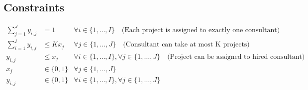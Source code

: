 \documentclass{article}
\begin{document}
\subsection*{Constraints}
\begin{align}
    \sum_{j=1}^{J} y_{i,j} & = 1 & \forall i \in \{1, \ldots, I\} \quad \text{(Each project is assigned to exactly one consultant)} \\
    \sum_{i=1}^{I} y_{i,j} & \leq K x_j & \forall j \in \{1, \ldots, J\} \quad \text{(Consultant can take at most K projects)} \\
    y_{i,j} & \leq x_j & \forall i \in \{1, \ldots, I\}, \forall j \in \{1, \ldots, J\} \quad \text{(Project can be assigned to hired consultant)} \\
    x_j & \in \{0, 1\} & \forall j \in \{1, \ldots, J\} \\
    y_{i,j} & \in \{0, 1\} & \forall i \in \{1, \ldots, I\}, \forall j \in \{1, \ldots, J\}
\end{align}
\end{document}
